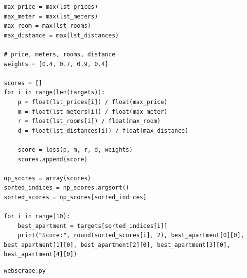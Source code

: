 \documentclass[12pt]{article}
\begin{document}
\begin{lstlisting}
max_price = max(lst_prices)
max_meter = max(lst_meters)
max_room = max(lst_rooms)
max_distance = max(lst_distances)

# price, meters, rooms, distance
weights = [0.4, 0.7, 0.9, 0.4]

scores = []
for i in range(len(targets)):
    p = float(lst_prices[i]) / float(max_price)
    m = float(lst_meters[i]) / float(max_meter)
    r = float(lst_rooms[i]) / float(max_room)
    d = float(lst_distances[i]) / float(max_distance)

    score = loss(p, m, r, d, weights)
    scores.append(score)

np_scores = array(scores)
sorted_indices = np_scores.argsort()
sorted_scores = np_scores[sorted_indices]

for i in range(10):
    best_apartment = targets[sorted_indices[i]]
    print("Score:", round(sorted_scores[i], 2), best_apartment[0][0], best_apartment[1][0], best_apartment[2][0], best_apartment[3][0], best_apartment[4][0])

\end{lstlisting}

\newpage
\begin{verbatim}
webscrape.py
\end{verbatim}
\end{document}
